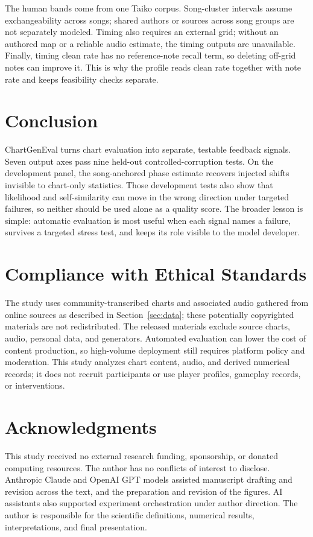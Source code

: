 \documentclass[10pt,twocolumn]{article}
\newcommand{\secref}[1]{Section~\ref{#1}}
\begin{document}
The human bands come from one Taiko corpus. Song-cluster intervals assume
exchangeability across songs; shared authors or sources across song groups
are not separately modeled. Timing also requires an external
grid; without an authored map or a reliable audio estimate, the timing outputs
are unavailable. Finally, timing clean rate has no reference-note recall term,
so deleting off-grid notes can improve it. This is why the profile reads clean
rate together with note rate and keeps feasibility checks separate.

\FloatBarrier

\section{Conclusion}\label{sec:conclusion}

ChartGenEval turns chart evaluation into separate, testable feedback signals.
Seven output axes pass nine held-out controlled-corruption tests. On the
development panel, the song-anchored phase estimate recovers injected shifts
invisible to chart-only statistics. Those development tests also show that
likelihood and self-similarity can move in the wrong direction under targeted
failures, so neither should be used alone as a quality score. The broader lesson is simple:
automatic evaluation is most useful when each signal names a failure, survives
a targeted stress test, and keeps its role visible to the model developer.

\section*{Compliance with Ethical Standards}
The study uses community-transcribed charts and associated audio
gathered from online sources as described in \secref{sec:data}; these
potentially copyrighted materials are not redistributed. The released
materials exclude source charts, audio, personal data, and generators.
Automated evaluation can lower the cost of content production, so high-volume
deployment still requires platform policy and moderation.
This study analyzes chart content, audio, and derived numerical records; it
does not recruit participants or use player profiles, gameplay records, or
interventions.

\section*{Acknowledgments}
This study received no external research funding, sponsorship, or donated
computing resources. The author has no conflicts of interest to disclose.
Anthropic Claude and OpenAI GPT models assisted manuscript drafting and
revision across the text, and the preparation and revision of the figures.
AI assistants also supported experiment orchestration under author direction.
The author is responsible for the scientific definitions, numerical results,
interpretations, and final presentation.
\end{document}
